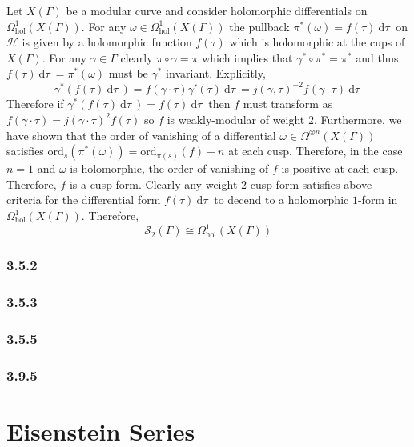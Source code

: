 \documentclass{article}
\renewcommand{\d}[1]{\: \mathrm{d}#1 \:}
\theoremstyle{definition}
\newcommand{\ord}{\mathrm{ord}}
\renewcommand{\S}[1]{\mathcal{S}_{#1}}
\newcommand{\half}{\mathcal{H}}
\begin{document}
Let $X(\Gamma)$ be a modular curve and consider holomorphic differentials on $\Omega^1_{\text{hol}}(X(\Gamma))$. For any $\omega \in \Omega^1_{\text{hol}}(X(\Gamma))$ the pullback $\pi^*(\omega) = f(\tau) \d{\tau}$ on $\half$ is given by a holomorphic function $f(\tau)$ which is holomorphic at the cups of $X(\Gamma)$. For any $\gamma \in \Gamma$ clearly $\pi \circ \gamma = \pi$ which implies that $\gamma^* \circ \pi^* = \pi^*$ and thus $f(\tau) \d{\tau} = \pi^*(\omega)$ must be $\gamma^*$ invariant. Explicitly,
\[ \gamma^*(f(\tau) \d{\tau}) = f(\gamma \cdot \tau) \gamma'(\tau) \d{\tau} = j(\gamma, \tau)^{-2} f(\gamma \cdot \tau) \d{\tau} \]
Therefore if $\gamma^*(f(\tau) \d{\tau}) = f(\tau) \d{\tau}$ then $f$ must transform as $f(\gamma \cdot \tau) = j(\gamma \cdot \tau)^2 f(\tau)$ so $f$ is weakly-modular of weight $2$. Furthermore, we have shown that the order of vanishing of a differential $\omega \in \Omega^{\otimes n}(X(\Gamma))$ satisfies $\ord_{s}(\pi^*(\omega)) = \ord_{\pi(s)}(f) + n$ at each cusp. Therefore, in the case $n = 1$ and $\omega$ is holomorphic, the order of vanishing of $f$ is positive at each cusp. Therefore, $f$ is a cusp form. Clearly any weight $2$ cusp form satisfies above criteria for the differential form $f(\tau) \d{\tau}$ to decend to a holomorphic $1$-form in $\Omega^1_{\text{hol}}(X(\Gamma))$. Therefore,
\[ \S{2}(\Gamma) \cong \Omega^1_{\text{hol}}(X(\Gamma)) \]

\subsubsection*{3.5.2}

\subsubsection*{3.5.3}

\subsubsection*{3.5.5}

\subsubsection*{3.9.5}



\section{Eisenstein Series}
\end{document}
